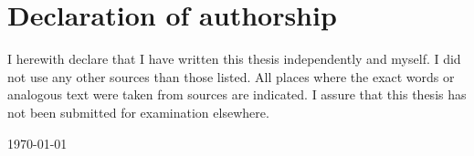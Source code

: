 \chapter*{Declaration of authorship}

I herewith declare that I have written this thesis independently and myself. I
did not use any other sources than those listed. All places where the exact
words or analogous text were taken from sources are indicated.  I assure that
this thesis has not been submitted for examination elsewhere.

\today
